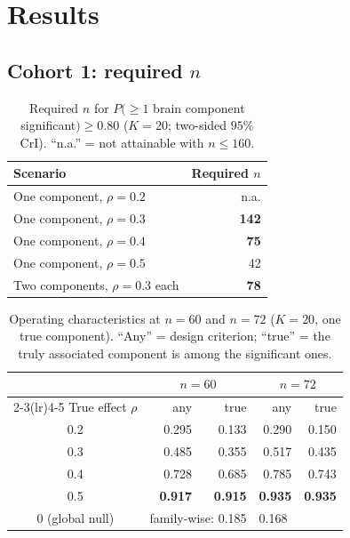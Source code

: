 \documentclass[11pt,a4paper]{article}
\begin{document}
\section{Results}

\subsection{Cohort 1: required $n$}

\begin{table}[H]
\centering\small
\caption{Required $n$ for $P(\ge1$ brain component significant$)\ge0.80$ ($K=20$; two-sided $95\%$ CrI). ``n.a.'' = not attainable with $n\le160$.}
\label{tab:nreq}
\begin{tabular}{lr}
\toprule
Scenario & Required $n$\\
\midrule
One component, $\rho=0.2$ & n.a.\\
\rowcolor{RowGrey}
One component, $\rho=0.3$ & \textbf{142}\\
\rowcolor{RowGrey}
One component, $\rho=0.4$ & \textbf{75}\\
One component, $\rho=0.5$ & 42\\
Two components, $\rho=0.3$ each & \textbf{78}\\
\bottomrule
\end{tabular}
\end{table}

\begin{table}[H]
\centering\small
\caption{Operating characteristics at $n=60$ and $n=72$ ($K=20$, one true component). ``Any'' = design criterion; ``true'' = the truly associated component is among the significant ones.}
\label{tab:opera}
\begin{tabular}{crrrr}
\toprule
 & \multicolumn{2}{c}{$n=60$} & \multicolumn{2}{c}{$n=72$}\\
\cmidrule(lr){2-3}\cmidrule(lr){4-5}
True effect $\rho$ & any & true & any & true\\
\midrule
0.2 & 0.295 & 0.133 & 0.290 & 0.150\\
0.3 & 0.485 & 0.355 & 0.517 & 0.435\\
0.4 & 0.728 & 0.685 & 0.785 & 0.743\\
0.5 & \textbf{0.917} & \textbf{0.915} & \textbf{0.935} & \textbf{0.935}\\
\midrule
$0$ (global null) & \multicolumn{2}{l}{family-wise: 0.185} & \multicolumn{2}{l}{0.168}\\
\bottomrule
\end{tabular}
\end{table}
\end{document}
